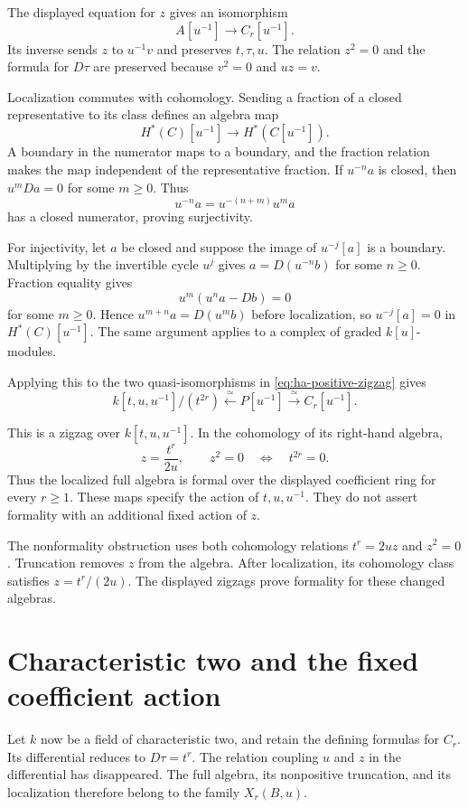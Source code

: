 The displayed equation for $z$ gives an isomorphism
\[
 A[u^{-1}]\longrightarrow C_r[u^{-1}].
\]
Its inverse sends $z$ to $u^{-1}v$ and preserves $t,\tau,u$.
The relation $z^2=0$ and the formula for $D\tau$ are preserved
because $v^2=0$ and $uz=v$.

Localization commutes with cohomology.
Sending a fraction of a closed representative to its class defines
an algebra map
\[
 H^*(C)[u^{-1}]\longrightarrow H^*(C[u^{-1}]).
\]
A boundary in the numerator maps to a boundary, and the fraction
relation makes the map independent of the representative fraction.
If $u^{-n}a$ is closed, then $u^mDa=0$ for some $m\geq0$.
Thus
\[
 u^{-n}a=u^{-(n+m)}u^ma
\]
has a closed numerator, proving surjectivity.

For injectivity, let $a$ be closed and suppose the image of
$u^{-j}[a]$ is a boundary.
Multiplying by the invertible cycle $u^j$ gives
$a=D(u^{-n}b)$ for some $n\geq0$.
Fraction equality gives
\[
 u^m(u^na-Db)=0
\]
for some $m\geq0$.
Hence $u^{m+n}a=D(u^mb)$ before localization, so
$u^{-j}[a]=0$ in $H^*(C)[u^{-1}]$.
The same argument applies to a complex of graded $k[u]$-modules.

Applying this to the two quasi-isomorphisms in
\eqref{eq:ha-positive-zigzag} gives
\[
 k[t,u,u^{-1}]/(t^{2r})
 \xleftarrow{\ \simeq\ }P[u^{-1}]
 \xrightarrow{\ \simeq\ }C_r[u^{-1}].
\]

This is a zigzag over $k[t,u,u^{-1}]$.
In the cohomology of its right-hand algebra,
\[
 z=\frac{t^r}{2u},\qquad z^2=0
 \quad\Longleftrightarrow\quad t^{2r}=0.
\]
Thus the localized full algebra is formal over the displayed
coefficient ring for every $r\geq1$.
These maps specify the action of $t,u,u^{-1}$.
They do not assert formality with an additional fixed action of $z$.

The nonformality obstruction uses both cohomology relations
$t^r=2uz$ and $z^2=0$.
Truncation removes $z$ from the algebra.
After localization, its cohomology class satisfies $z=t^r/(2u)$.
The displayed zigzags prove formality for these changed algebras.

\section{Characteristic two and the fixed coefficient action}
\label{sec:ha-characteristic-two}

Let $k$ now be a field of characteristic two, and retain the defining
formulas for $C_r$. Its differential reduces to $D\tau=t^r$.
The relation coupling $u$ and $z$ in the differential has disappeared.
The full algebra, its nonpositive truncation, and its localization
therefore belong to the family $X_r(B,u)$.

